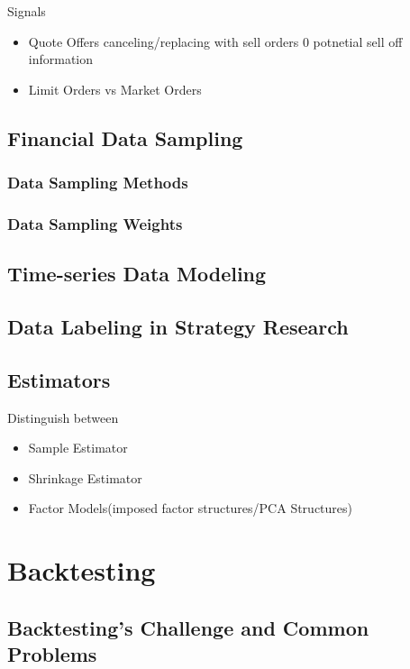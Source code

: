 \documentclass[11pt, openany]{book}              %
\begin{document}
Signals

\begin{itemize}
 \item Quote Offers canceling/replacing with sell orders 0 potnetial sell off information
 \item Limit Orders vs Market Orders 
\end{itemize}

\section{Financial Data Sampling}

\subsection{Data Sampling Methods}

\subsection{Data Sampling Weights}

\section{Time-series Data Modeling}

\section{Data Labeling in Strategy Research}

\section{Estimators}

Distinguish between
\begin{itemize}
	\item Sample Estimator
	\item Shrinkage Estimator
	\item Factor Models(imposed factor structures/PCA Structures)
\end{itemize}

\chapter{Backtesting}

\section{Backtesting's Challenge and Common Problems}
\end{document}
